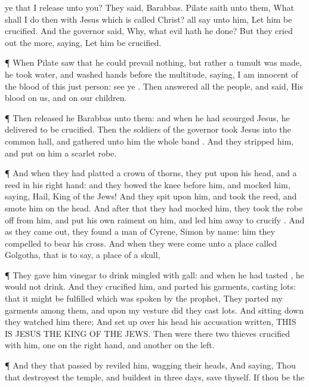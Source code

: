 {ye that I
release unto
you?
They
said,
Barabbas.
Pilate
saith unto
them,
What shall I
do
then with
Jesus which is
called
Christ?
{}
all say
unto
him, Let him be
crucified.
And the
governor
said,
Why,
what
evil hath he
done?
But
they cried
out the
more,
saying, Let him be
crucified.
\par }{\PP {}¶
When
Pilate
saw
that he could
prevail
nothing,
but
{}
rather a
tumult was
made, he
took
water, and
washed
{}
hands
before the
multitude,
saying, I
am
innocent
of the
blood of
this just
person:
see
ye
{}.
Then
answered
all the
people, and
said,
His
blood
{}
on
us,
and
on
our
children.
\par }{\PP {}¶
Then released
he
Barabbas unto
them:
and when he had
scourged
Jesus, he
delivered
{}
to be
crucified.
Then the
soldiers of the
governor
took
Jesus
into the common
hall, and
gathered
unto
him the
whole
band
{}.
And they
stripped
him, and put
on
him a
scarlet
robe.
\par }{\PP {}¶
And when they had
platted a
crown
of
thorns, they
put
{}
upon
his
head,
and a
reed
in
his right
hand:
and they bowed the
knee
before
him, and
mocked
him,
saying,
Hail,
King of the
Jews!
And they
spit
upon
him, and
took the
reed,
and
smote
him
on the
head.
And
after that they had
mocked
him, they
took the
robe
off from
him,
and
put his
own
raiment
on
him,
and
led
him
away
to
crucify
{}.
And as they came
out, they
found a
man of
Cyrene,
Simon by
name:
him they
compelled
to
bear
his
cross.
And when they were
come
unto a
place
called
Golgotha,
that
is to
say, a
place of a
skull,
\par }{\PP {}¶ They
gave
him
vinegar to
drink
mingled
with
gall:
and when he had
tasted
{}, he
would
not
drink.
And they
crucified
him, and
parted
his
garments,
casting
lots:
that it might be
fulfilled which was
spoken
by the
prophet, They
parted
my
garments among
them,
and
upon
my
vesture did they
cast
lots.
And sitting
down they
watched
him
there;
And set
up
over
his
head
his
accusation
written,
THIS
IS
JESUS THE
KING OF THE
JEWS.
Then were
there
two
thieves crucified
with
him,
one
on the right
hand,
and
another
on the
left.
\par }{\PP {}¶
And they that passed
by
reviled
him,
wagging
their
heads,
And
saying, Thou that
destroyest the
temple,
and
buildest
{}
in
three
days,
save
thyself.
If thou
be the
}
